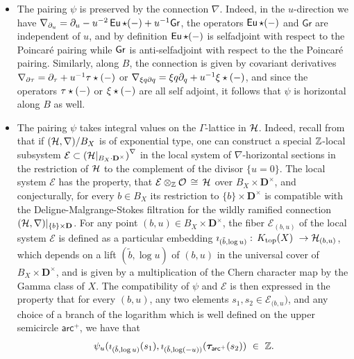 \documentclass[twoside,leqno]{article}
\numberwithin{equation}{section}
\theoremstyle{plain}
\theoremstyle{definition}
\begin{document}
\begin{itemize}[wide]
\item[(a)] The pairing  $\psi$ is preserved by the connection $\nabla$. Indeed, in the $u$-direction we have $\nabla_{\partial_{u}} = \partial_{u} - u^{-2} \operatorname{\mathsf{Eu}}\star (-) + u^{-1}\mathsf{Gr}$, the operators 
$\operatorname{\mathsf{Eu}}\star (-)$ and $\mathsf{Gr}$ are independent of $u$, and by definition 
$\operatorname{\mathsf{Eu}}\star (-)$ is selfadjoint with respect to the Poincar\'{e} pairing while $\mathsf{Gr}$ is anti-selfadjoint with respect to the the Poincar\'{e} pairing. Similarly, along $B$, the connection is given by covariant derivatives 
$\nabla_{\partial{\tau}} = \partial_{\tau} + u^{-1} \tau\star(-)$ or $\nabla_{\xi q\partial{q}} = \xi q\partial_{q} + u^{-1} \xi\star(-)$, and since the operators $\tau\star(-)$ or $\xi\star(-)$ are all self adjoint, it follows that $\psi$ is horizontal along $B$ as well.
\item[(b)]  The pairing $\psi$ takes integral values on the $\Gamma$-lattice in $\mathcal H$. Indeed, recall from \cite[Section~3.1]{Katzarkov_Hodge_theoretic_aspects} that if $(\mathcal H,\nabla)/B_{X}$ is of exponential type, one can construct a special $\mathbb Z$-local subsystem  $\mathcal{E} \subset \left(\mathcal H|_{B_{X}\cdot \mathbf{D}^{\times}}\right)^{\nabla}$ in the local system of $\nabla$-horizontal sections in the restriction of $\mathcal H$ to the complement of the divisor $\{u = 0\}$. The local system $\mathcal{E}$ has the property, that $\mathcal{E}\otimes_{\mathbb Z} \mathcal O \, \cong \, \mathcal H$ over $B_{X}\times \mathbf{D}^{\times}$, and conjecturally, for every $b \in B_{X}$ its restriction to $\{b\}\times \mathbf{D}^{\times}$ is compatible with the Deligne-Malgrange-Stokes filtration for the wildly ramified  connection $(\mathcal H,\nabla)|_{\{b\}\times \mathbf{D}}$. For any point $(b,u) \in B_{X}\times \mathbf{D}^{\times}$, the fiber $\mathcal{E}_{(b,u)}$ of the local system $\mathcal{E}$ is defined as a particular embedding $\imath_{(\tilde{b},\log u)}  : \, K_{\op{top}}(X) \ \to \cH_{(b,u)}$, which depends on a lift $(\tilde{b},\log u)$ of $(b,u)$ in the universal cover of $B_{X}\times \mathbf{D}^{\times}$, and is given by a multiplication of the Chern character map by the Gamma class of $X$. The compatibility of $\psi$ and $\mathcal{E}$ is then expressed in the property that 
for every $(b,u)$, any two elements $s_{1}, s_{2} \in \mathcal{E}_{(b,u})$, and any choice of a branch of the logarithm which is well defined on the upper semicircle $\mathsf{arc}^{+}$,  we have 
that 
\[
\psi_{u}(\imath_{(\tilde{b},\log u)}(s_{1}),\imath_{(\tilde{b},\log (-u))}(\boldsymbol{\tau}_{\mathsf{arc}^{+}}(s_{2})) \ \in \ \bbZ.
\]
\end{itemize}
\end{document}
